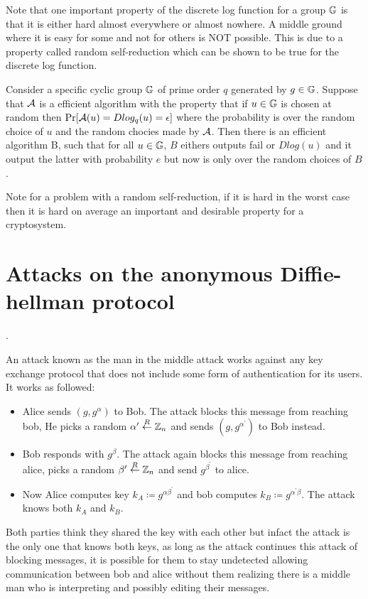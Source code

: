 Note that one important property of the discrete log function for a group \( \mathbb{G}\) is that it is either hard almost everywhere or almost nowhere. A middle ground where it is easy for some and not for others is NOT possible. This is due to a property called random self-reduction which can be shown to be true for the discrete log function. 

\begin{theorem}
    Consider a specific cyclic group \(\mathbb{G}\) of prime order \(q\) generated by \(g \in \mathbb{G}\). Suppose that \(\mathcal{A}\) is a efficient algorithm with the property that if \(u \in \mathbb{G}\) is chosen at random then \(\Pr[\mathcal{A}(u) = Dlog_q(u) = \epsilon ]\) where the probability is over the random choice of \(u\) and the random chocies made by \(\mathcal{A}\). Then there is an efficient algorithm B, such that for all \( u \in \mathbb{G}\), \(B\) eithers outputs fail  or \(Dlog(u)\)  and it output the latter with probability \(e\) but now is only over the random choices of \(B\).          
\end{theorem}

Note for a problem with a random self-reduction, if it is hard in the worst case then it is hard on average an important and desirable property for a cryptosystem. 

\section{Attacks on the anonymous Diffie-hellman protocol}. 

An attack known as the man in the middle attack works against any key exchange protocol that does not include some form of authentication for its users. It works as followed: 
\begin{itemize}
    \item Alice sends \((g, g^\alpha )\) to Bob.  The attack blocks this message from reaching bob, He picks a random \(\alpha^\prime \overset{R}{\gets} \mathbb{Z}_n\) and sends \((g, g^{\alpha^\prime })\) to Bob instead. 
    \item Bob responds with \(g^\beta \). The attack again blocks this message from reaching alice, picks a random \(\beta^\prime  \overset{R}{\gets} \mathbb{Z}_n \)  and send \(g^{\beta^\prime }\) to alice. 
    \item Now Alice computes key \(k_A \coloneqq g^{\alpha \beta^\prime }\)  and bob computes \(k_B \coloneqq g^{\alpha^\prime \beta }\). The attack knows both \(k_A\) and \(k_B\).   
\end{itemize}
Both parties think they shared the key with each other but infact the attack is the only one that knows both keys, as long as the attack continues this attack of blocking messages, it is possible for them to stay undetected allowing communication between bob and alice without them realizing there is a middle man who is interpreting and possibly editing their messages.

